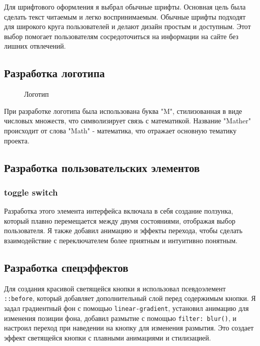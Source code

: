 \documentclass{article}
\begin{document}
    Для шрифтового оформления я выбрал обычные шрифты. Основная цель была сделать текст читаемым и легко воспринимаемым. Обычные шрифты подходят для широкого круга пользователей и делают дизайн простым и доступным. Этот выбор помогает пользователям сосредоточиться на информации на сайте без лишних отвлечений.


    \subsection{Разработка логотипа}

    \begin{figure}[h]
        \centering
        
        \caption{Логотип}
    \end{figure}

    При разработке логотипа была использована буква "M", стилизованная в виде числовых множеств, что символизирует связь с математикой. Название "Mather" происходит от слова "Math" - математика, что отражает основную тематику проекта.


    \subsection{Разработка пользовательских элементов}

    \subsubsection{toggle switch}
    Разработка этого элемента интерфейса включала в себя создание ползунка, который плавно перемещается между двумя состояниями, отображая выбор пользователя. Я также добавил анимацию и эффекты перехода, чтобы сделать взаимодействие с переключателем более приятным и интуитивно понятным.


    \subsection{Разработка спецэффектов}

    Для создания красивой светящейся кнопки я использовал псевдоэлемент \texttt{::before}, который добавляет дополнительный слой перед содержимым кнопки. Я задал градиентный фон с помощью \texttt{linear-gradient}, установил анимацию для изменения позиции фона, добавил размытие с помощью \texttt{filter: blur()}, и настроил переход при наведении на кнопку для изменения размытия. Это создает эффект светящейся кнопки с плавными анимациями и стилизацией.
\end{document}
